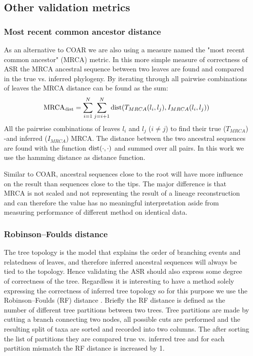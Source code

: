 \subsection{Other validation metrics}

\subsubsection{Most recent common ancestor distance}
As an alternative to COAR we are also using a measure named the "most recent common ancestor" (MRCA) metric.
In this more simple measure of correctness of ASR the MRCA ancestral sequence between two leaves are found and compared in the true vs. inferred phylogeny.
By iterating through all pairwise combinations of leaves the MRCA distance can be found as the sum:
$$
\text{\text{MRCA}}_{\text{dist}} = \sum_{i=1}^{N} \sum_{j=i+1}^{N} \text{dist}(T_{MRCA}(l_i, l_j), I_{MRCA}(l_i, l_j))
$$
All the pairwise combinations of leaves $l_i$ and $l_j$ ($i \neq j$) to find their true ($T_{MRCA}$) -and inferred ($I_{MRCA}$) MRCA.
The distance between the two ancestral sequences are found with the function $\text{dist}(\cdot, \cdot)$ and summed over all pairs.
In this work we use the hamming distance as distance function.

Similar to COAR, ancestral sequences close to the root will have more influence on the result than sequences close to the tips.
The major difference is that MRCA is not scaled and not representing the result of a lineage reconstruction and can therefore the value has no meaningful interpretation aside from measuring performance of different method on identical data.


\subsubsection{Robinson–Foulds distance}
The tree topology is the model that explains the order of branching events and relatedness of leaves, and therefore inferred ancestral sequences will always be tied to the topology.
Hence validating the ASR should also express some degree of correctness of the tree.
Regardless it is interesting to have a method solely expressing the correctness of inferred tree topology so for this purpose we use the Robinson–Foulds (RF) distance \cite{robinson1981comparison}.
Briefly the RF distance is defined as the number of different tree partitions between two trees.
Tree partitions are made by cutting a branch connecting two nodes, all possible cuts are performed and the resulting split of taxa are sorted and recorded into two columns.
The after sorting the list of partitions they are compared true vs. inferred tree and for each partition mismatch the RF distance is increased by 1.



